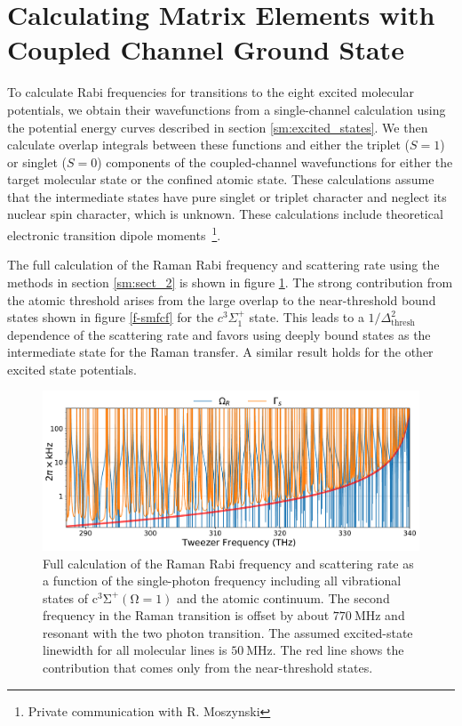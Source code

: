 \documentclass[aps,secnumarabic,amsmath,amssymb,10pt,superscriptaddress]{revtex4}
\begin{document}
\section{Calculating Matrix Elements with Coupled Channel Ground State}
To calculate Rabi frequencies for transitions to the eight excited molecular potentials, we
obtain their wavefunctions from a single-channel calculation \cite{Fattal1996} using the potential energy curves described in section \ref{sm:excited_states}. We
then calculate overlap integrals between these functions and either the triplet ($S=1$) or singlet ($S=0$) components of the
coupled-channel wavefunctions for either the target molecular state or the confined atomic state.
These calculations assume that the intermediate states have pure singlet or triplet character and neglect its
nuclear spin character, which is unknown. These calculations include theoretical electronic transition dipole moments~\footnote{Private communication with R. Moszynski}.

The full calculation of the Raman Rabi frequency and scattering rate using the methods in section \ref{sm:sect_2} is shown in figure \ref{f-sm}. The strong contribution from the atomic threshold arises from the large overlap to the near-threshold bound states shown in figure \ref{f-smfcf} for the $c^3\Sigma^+_1$ state. This leads to a $1/\Delta_{\text{thresh}}^2$ dependence of the scattering rate and favors using deeply bound states as the intermediate state for the Raman transfer. A similar result holds for the other excited state potentials.



\begin{figure}[ht!]
  \includegraphics[width=\textwidth]{imgs/raman_theory_full.pdf}
  \caption{Full calculation of the Raman Rabi frequency and scattering rate
    as a function of the single-photon frequency
    including all vibrational states of $ \mathrm{c^3\Sigma^+(\Omega = 1)}$
    and the atomic continuum.
    The second frequency in the Raman transition is offset by about $770~\mathrm{MHz}$
    and resonant with the two photon transition.
    The assumed excited-state linewidth for all molecular lines is $50~\text{MHz}$.
    The red line shows the contribution that comes only from the near-threshold states.
    \label{f-sm}}
\end{figure}
\end{document}
